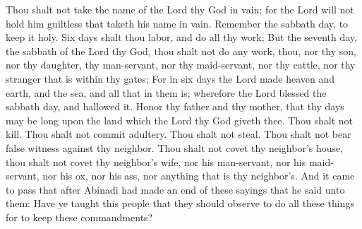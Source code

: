 Thou shalt not take the name of the Lord thy God in vain; for the Lord will not hold him guiltless that taketh his name in vain.
\bverse \iffalse Remember the sabbath day, to keep it holy. \fi
Remember the sabbath day, to keep it holy.
\bverse \iffalse Six days shalt thou labor, and do all thy work; \fi
Six days shalt thou labor, and do all thy work;
\bverse \iffalse But the seventh day, the sabbath of the Lord thy God, thou shalt not do any work, thou, nor thy son, nor thy daughter, thy man-servant, nor thy maid-servant, nor thy cattle, nor thy stranger that is within thy gates; \fi
But the seventh day, the sabbath of the Lord thy God, thou shalt not do any work, thou, nor thy son, nor thy daughter, thy man-servant, nor thy maid-servant, nor thy cattle, nor thy stranger that is within thy gates;
\bverse \iffalse For in six days the Lord made heaven and earth, and the sea, and all that in them is; wherefore the Lord blessed the sabbath day, and hallowed it. \fi
For in six days the Lord made heaven and earth, and the sea, and all that in them is; wherefore the Lord blessed the sabbath day, and hallowed it.
\bverse \iffalse Honor thy father and thy mother, that thy days may be long upon the land which the Lord thy God giveth thee. \fi
Honor thy father and thy mother, that thy days may be long upon the land which the Lord thy God giveth thee.
\bverse \iffalse Thou shalt not kill. \fi
Thou shalt not kill.
\bverse \iffalse Thou shalt not commit adultery. Thou shalt not steal. \fi
Thou shalt not commit adultery. Thou shalt not steal.
\bverse \iffalse Thou shalt not bear false witness against thy neighbor. \fi
Thou shalt not bear false witness against thy neighbor.
\bverse \iffalse Thou shalt not covet thy neighbor's house, thou shalt not covet thy neighbor's wife, nor his man-servant, nor his maid-servant, nor his ox, nor his ass, nor anything that is thy neighbor's. \fi
Thou shalt not covet thy neighbor's house, thou shalt not covet thy neighbor's wife, nor his man-servant, nor his maid-servant, nor his ox, nor his ass, nor anything that is thy neighbor's.
\bverse \iffalse And it came to pass that after Abinadi had made an end of these sayings that he said unto them: Have ye taught this people that they should observe to do all these things for to keep these commandments? \fi
And it came to pass that after Abinadi had made an end of these sayings that he said unto them: Have ye taught this people that they should observe to do all these things for to keep these commandments?
